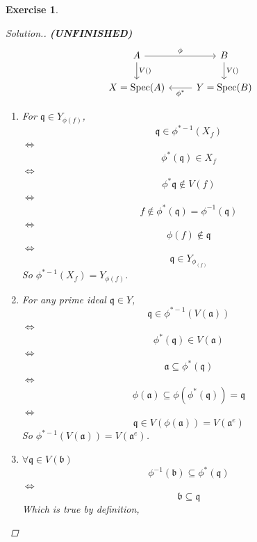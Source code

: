 \documentclass{article}
\theoremstyle{breakstyle}
\newtheorem{exercise}{Exercise}
\newenvironment{solution}
  {\begin{proof}[Solution.]\renewcommand{\qedsymbol}{}}
  {\end{proof}}
\begin{document}
\begin{exercise}
\begin{solution}
    \textbf{(UNFINISHED)}
        $$
        \begin{tikzcd}
        A \arrow[r, "\phi"] \arrow[d, "V()"] & B \arrow[d, "V()"]                     \\
        X=\mathrm{Spec}(A)                   & Y=\mathrm{Spec}(B) \arrow[l, "\phi^*"]
        \end{tikzcd}
        $$
        \begin{enumerate}[label=({\roman*})]
            \item For $\mathfrak{q}\in Y_{\phi(f)}$,
                $$
                \mathfrak{q}\in \phi^{*-1}(X_{f})
                $$
                $\Leftrightarrow$ 
                $$
                \phi^{*}(\mathfrak{q})\in X_{f}
                $$
                $\Leftrightarrow$
                $$
                \phi^{*}\mathfrak{q}\not\in V(f)
                $$
                $\Leftrightarrow$ 
                $$
                f\not\in \phi^{*}(\mathfrak{q})=\phi^{-1}(\mathfrak{q})
                $$
                $\Leftrightarrow$ 
                $$
                \phi(f)\not\in \mathfrak{q}
                $$
                $\Leftrightarrow$ 
                $$
                \mathfrak{q}\in Y_{\phi_{(f)}}
                $$
                So $\phi^{*-1}(X_{f})=Y_{\phi(f)}$.
            \item 
                For any prime ideal $\mathfrak{q}\in Y$,
                $$
                \mathfrak{q}\in \phi^{*-1}(V(\mathfrak{a}))
                $$
                $\Leftrightarrow$ 
                $$
                \phi^{*}(\mathfrak{q})\in V(\mathfrak{a})
                $$
                $\Leftrightarrow$ 
                $$
                \mathfrak{a}\subseteq \phi^{*}(\mathfrak{q})
                $$
                $\Leftrightarrow$ 
                $$
                 \phi(\mathfrak{a})\subseteq \phi(\phi^{*}(\mathfrak{q}))=\mathfrak{q}
                $$
                $\Leftrightarrow$ 
                $$
                \mathfrak{q}\in V(\phi(\mathfrak{a}))=V(\mathfrak{a}^{e})
                $$
                So $\phi^{*-1}(V(\mathfrak{a}))=V(\mathfrak{a}^{e})$.
            \item $\forall \mathfrak{q}\in V(\mathfrak{b})$ 
                $$
                \phi^{-1}(\mathfrak{b})\subseteq \phi^{*}(\mathfrak{q})
                $$
                $\Leftrightarrow$ 
                $$
                \mathfrak{b}\subseteq \mathfrak{q}
                $$
                Which is true by definition,

\end{enumerate}
\end{solution}
\end{exercise}
\end{document}
